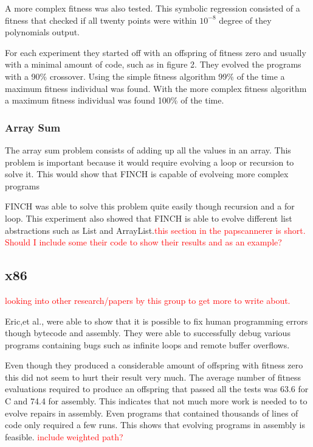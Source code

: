\documentclass{sig-alternate}
\newcommand{\mycomment}[1]{\textcolor{red}{#1}}
\begin{document}
A more complex fitness was also tested. This symbolic regression consisted of a fitness that checked if all twenty points were within $10^{-8}$ degree of they polynomials output. 

For each experiment they started off with an offspring of fitness zero and usually with a minimal amount of code, such as in figure 2. They evolved the programs with a 90\% crossover. Using the simple fitness algorithm 99\% of the time a maximum fitness individual was found. With the more complex fitness algorithm a maximum fitness individual was found 100\% of the time.


\subsubsection{Array Sum}
The array sum problem consists of adding up all the values in an array. This problem is important because it would require evolving a loop or recursion to solve it. This would show that FINCH is capable of evolveing more complex programs\par
FINCH was able to solve this problem quite easily though recursion and a for loop. This experiment also showed that FINCH is able to evolve different list abstractions such as List and ArrayList.\mycomment{this section in the papscannerer is short. Should I include some their code to show their results and as an example?} 


\subsection{x86}
\mycomment{looking into other research/papers by this group to get more to write about.}

Eric,et al., were able to show that it is possible to fix human programming errors though bytecode and assembly. They were able to successfully debug various programs containing bugs such as infinite loops and remote buffer overflows.

Even though they produced a considerable amount of offspring with fitness zero this did not seem to hurt their result very much. The average number of fitness evaluations required to produce an offspring that passed all the tests was 63.6 for C and 74.4 for assembly. This indicates that not much more work is needed to to evolve repairs in assembly. Even programs that contained thousands of lines of code only required a few runs. This shows that evolving programs in assembly is feasible. \mycomment{include weighted path?}
\end{document}

